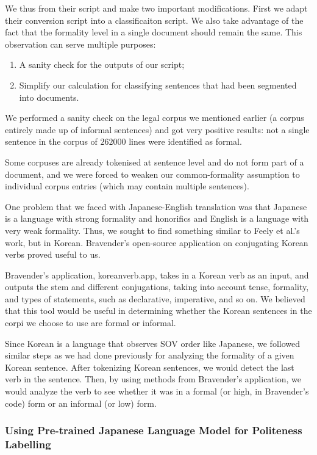 \documentclass[11pt]{article}
\begin{document}
We thus from their script and make two important modifications. First we adapt their conversion script into a classificaiton script.
We also take advantage of the fact that the formality level in a single document should remain the same. This observation can serve multiple purposes:

\begin{enumerate}[label=\arabic*]
    \item A sanity check for the outputs of our script;
    \item Simplify our calculation for classifying sentences that had been segmented into documents.
\end{enumerate}

We performed a sanity check on the legal corpus we mentioned earlier (a corpus entirely made up of informal sentences) and got very positive results: not a single sentence in the corpus of $262000$ lines were identified as formal.

Some corpuses are already tokenised at sentence level and do not form part of a document, and we were forced to weaken our common-formality assumption to individual corpus entries (which may contain multiple sentences). 

One problem that we faced with Japanese-English translation was that Japanese is a language with strong formality and honorifics and English is a language with very weak formality. Thus, we sought to find something similar to Feely et al.'s work, but in Korean. Bravender's open-source application on conjugating Korean verbs proved useful to us.

Bravender's application, koreanverb.app, takes in a Korean verb as an input, and outputs the stem and different conjugations, taking into account tense, formality, and types of statements, such as declarative, imperative, and so on. We believed that this tool would be useful in determining whether the Korean sentences in the corpi we choose to use are formal or informal.

Since Korean is a language that observes SOV order like Japanese, we followed similar steps as we had done previously for analyzing the formality of a given Korean sentence. After tokenizing Korean sentences, we would detect the last verb in the sentence. Then, by using methods from Bravender's application, we would analyze the verb to see whether it was in a formal (or high, in Bravender's code) form or an informal (or low) form.

\subsubsection{Using Pre-trained Japanese Language Model for Politeness Labelling}
\end{document}
